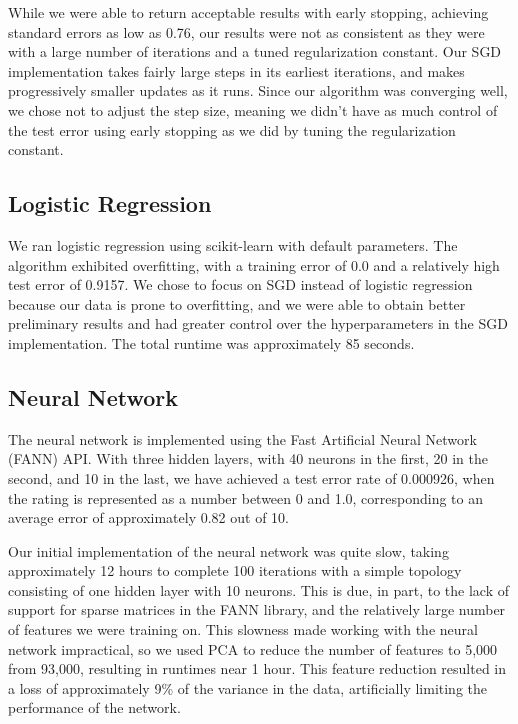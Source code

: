\documentclass[journal]{IEEEtran}
\begin{document}
While we were able to return acceptable results with early stopping, achieving standard errors as low as 0.76, our results were not as consistent as they were with a large number of iterations and a tuned regularization constant.  Our SGD implementation takes fairly large steps in its earliest iterations, and makes progressively smaller updates as it runs.  Since our algorithm was converging well, we chose not to adjust the step size, meaning we didn't have as much control of the test error using early stopping as we did by tuning the regularization constant.

\subsection{Logistic Regression}

We ran logistic regression using scikit-learn with default parameters.  The algorithm exhibited overfitting, with a training error of 0.0 and a relatively high test error of 0.9157.  We chose to focus on SGD instead of logistic regression because our data is prone to overfitting, and we were able to obtain better preliminary results and had greater control over the hyperparameters in the SGD implementation.  The total runtime was approximately 85 seconds.

\subsection{Neural Network}
The neural network is implemented using the Fast Artificial Neural Network (FANN)
API.  With three hidden layers, with 40 neurons in the first, 20 in the second, and 10 in the last,
we have achieved a test error rate of 0.000926, when the rating is represented as a
number between 0 and 1.0, corresponding to an average error of approximately 0.82 out of 10.
\\
\par Our initial implementation of the neural network was quite slow, taking approximately
12 hours to complete 100 iterations with a simple topology consisting of one hidden
layer with 10 neurons.  This is due, in part, to the lack of support for sparse matrices in the FANN library, and the relatively large number of features we were training on.  This slowness made working with the neural network impractical, so we used PCA to reduce the number of features to 5,000 from 93,000, resulting in runtimes near 1 hour.  This feature reduction resulted in a loss of approximately 9\% of the variance in the data, artificially limiting the performance of the network.  \\
\end{document}
